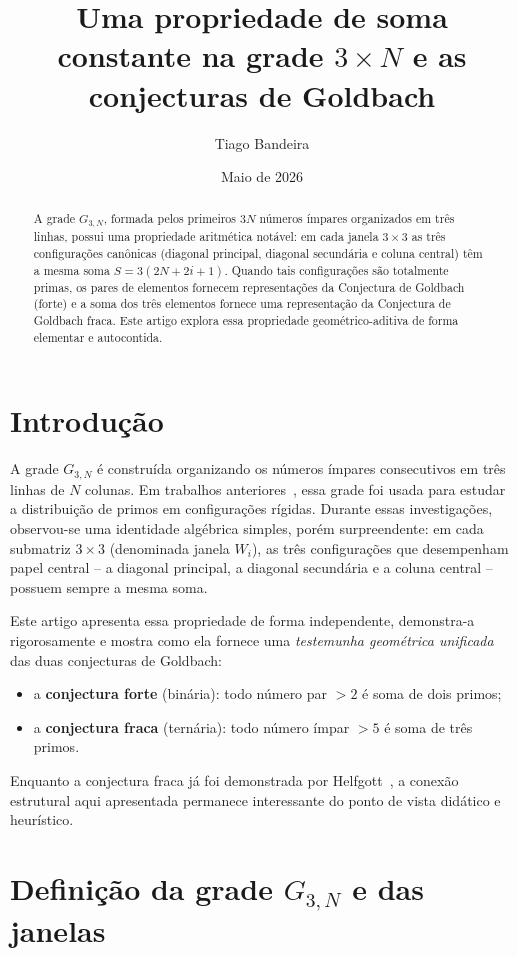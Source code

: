 \documentclass[12pt, a4paper]{article}
\title{Uma propriedade de soma constante na grade $3\times N$ e as conjecturas de Goldbach}
\author{Tiago Bandeira}
\date{Maio de 2026}
\begin{document}
	
	\maketitle
	
	\begin{abstract}
		A grade $G_{3,N}$, formada pelos primeiros $3N$ números ímpares organizados em três linhas, possui uma propriedade aritmética notável: em cada janela $3\times 3$ as três configurações canônicas (diagonal principal, diagonal secundária e coluna central) têm a mesma soma $S = 3(2N+2i+1)$. Quando tais configurações são totalmente primas, os pares de elementos fornecem representações da Conjectura de Goldbach (forte) e a soma dos três elementos fornece uma representação da Conjectura de Goldbach fraca. Este artigo explora essa propriedade geométrico-aditiva de forma elementar e autocontida.
	\end{abstract}
	
	\section{Introdução}
	
	A grade $G_{3,N}$ é construída organizando os números ímpares consecutivos em três linhas de $N$ colunas. Em trabalhos anteriores~\cite{bandeira2026}, essa grade foi usada para estudar a distribuição de primos em configurações rígidas. Durante essas investigações, observou-se uma identidade algébrica simples, porém surpreendente: em cada submatriz $3\times 3$ (denominada janela $W_i$), as três configurações que desempenham papel central – a diagonal principal, a diagonal secundária e a coluna central – possuem sempre a mesma soma.
	
	Este artigo apresenta essa propriedade de forma independente, demonstra-a rigorosamente e mostra como ela fornece uma \textit{testemunha geométrica unificada} das duas conjecturas de Goldbach:
	\begin{itemize}
		\item a \textbf{conjectura forte} (binária): todo número par $>2$ é soma de dois primos;
		\item a \textbf{conjectura fraca} (ternária): todo número ímpar $>5$ é soma de três primos.
	\end{itemize}
	Enquanto a conjectura fraca já foi demonstrada por Helfgott~\cite{helfgott2013}, a conexão estrutural aqui apresentada permanece interessante do ponto de vista didático e heurístico.
	
	\section{Definição da grade $G_{3,N}$ e das janelas}
	
\end{document}
